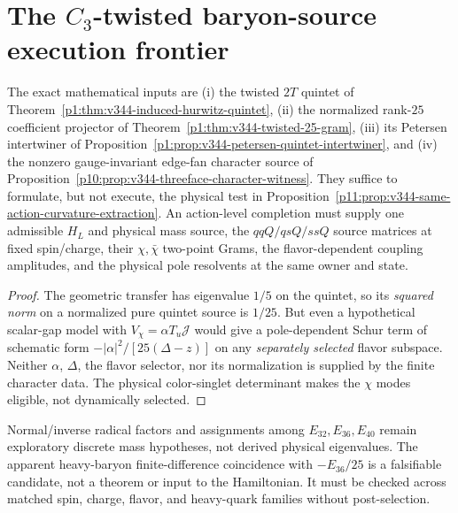 \documentclass[12pt,a4paper]{article}
\begin{document}
\printbibliography

\section{The $C_3$-twisted baryon-source execution frontier}
\label{p12:sec:v344-twisted-baryon-frontier}
\begin{proposition}
\label{p12:prop:v344-baryon-character-execution-ledger}
The exact mathematical inputs are (i) the twisted $2T$ quintet
of Theorem~\ref{p1:thm:v344-induced-hurwitz-quintet},
(ii) the normalized rank-$25$ coefficient projector
of Theorem~\ref{p1:thm:v344-twisted-25-gram},
(iii) its Petersen intertwiner
of Proposition~\ref{p1:prop:v344-petersen-quintet-intertwiner},
and (iv) the nonzero gauge-invariant edge-fan character source
of Proposition~\ref{p10:prop:v344-threeface-character-witness}.
They suffice to formulate, but not execute, the physical test in
Proposition~\ref{p11:prop:v344-same-action-curvature-extraction}.
An action-level completion must supply one admissible $H_L$ and
physical mass source, the $qqQ/qsQ/ssQ$ source matrices at fixed
spin/charge, their $\chi,\bar\chi$ two-point Grams, the
flavor-dependent coupling amplitudes, and the physical pole
resolvents at the same owner and state.
\end{proposition}
\begin{proof}
The geometric transfer has eigenvalue $1/5$ on the quintet,
so its \emph{squared norm} on a normalized pure quintet source is
$1/25$.  But even a hypothetical scalar-gap model with
$V_\chi=\alpha T_u\mathcal J$ would give a pole-dependent Schur
term of schematic form
$- |\alpha|^2/[25(\Delta-z)]$ on any \emph{separately selected}
flavor subspace.  Neither $\alpha$, $\Delta$, the flavor selector,
nor its normalization is supplied by the finite character data.
The physical color-singlet determinant makes the $\chi$ modes
eligible, not dynamically selected.
\end{proof}
\begin{remark}
Normal/inverse radical factors and assignments among
$E_{32},E_{36},E_{40}$ remain exploratory discrete mass
hypotheses, not derived physical eigenvalues.  The apparent
heavy-baryon finite-difference coincidence with $-E_{36}/25$
is a falsifiable candidate, not a theorem or input to the
Hamiltonian.  It must be checked across matched spin, charge,
flavor, and heavy-quark families without post-selection.
\end{remark}
\end{document}
